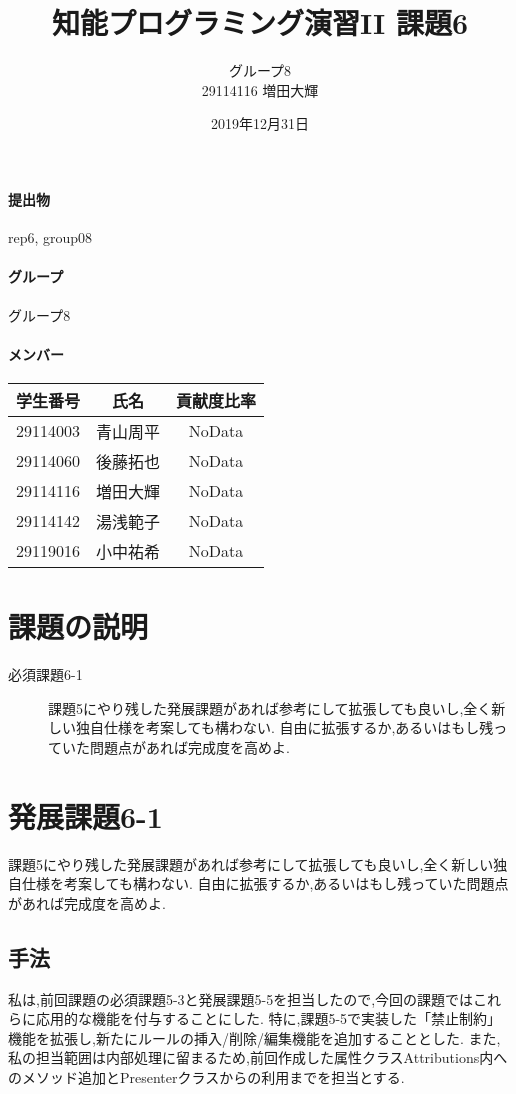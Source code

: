 \documentclass[uplatex,12pt]{jsarticle}
\title{知能プログラミング演習II 課題6}
\author{グループ8\\
  29114116 増田大輝\\
}
\date{2019年12月31日}
\begin{document}
\maketitle

\paragraph{提出物} rep6, group08
\paragraph{グループ} グループ8

\paragraph{メンバー}
\begin{tabular}{|c|c|c|}
  \hline
  学生番号&氏名&貢献度比率\\
  \hline\hline
  29114003&青山周平&NoData\\
  \hline
  29114060&後藤拓也&NoData\\
  \hline
  29114116&増田大輝&NoData\\
  \hline
  29114142&湯浅範子&NoData\\
  \hline
  29119016&小中祐希&NoData\\
  \hline
\end{tabular}



\section{課題の説明}
\begin{description}
\item[必須課題6-1] 課題5にやり残した発展課題があれば参考にして拡張しても良いし,全く新しい独自仕様を考案しても構わない.
自由に拡張するか,あるいはもし残っていた問題点があれば完成度を高めよ.
\end{description}


\section{発展課題6-1}
\begin{screen}
    課題5にやり残した発展課題があれば参考にして拡張しても良いし,全く新しい独自仕様を考案しても構わない.
    自由に拡張するか,あるいはもし残っていた問題点があれば完成度を高めよ.
\end{screen}

\subsection{手法}
私は,前回課題の必須課題5-3と発展課題5-5を担当したので,今回の課題ではこれらに応用的な機能を付与することにした.
特に,課題5-5で実装した「禁止制約」機能を拡張し,新たにルールの挿入/削除/編集機能を追加することとした.
また,私の担当範囲は内部処理に留まるため,前回作成した属性クラスAttributions内へのメソッド追加とPresenterクラスからの利用までを担当とする.
\end{document}
